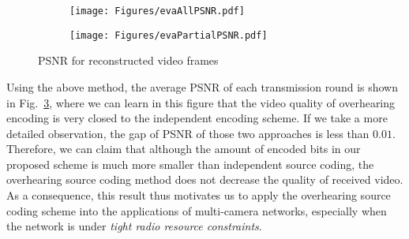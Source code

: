 %
\begin{figure}
\begin{center}
\begin{subfigure}[b]{\columnwidth}
\texttt{[image: Figures/evaAllPSNR.pdf]}
\caption{\label{fig::evaAllPSNR}}
\end{subfigure}
\begin{subfigure}[b]{\columnwidth}
\texttt{[image: Figures/evaPartialPSNR.pdf]}
\caption{\label{fig::evaPartialPSNR}}
\end{subfigure}
\caption{\label{fig::evaMultiRunPSNR} PSNR for reconstructed video frames}
\end{center}
\end{figure}
%
Using the above method, the average PSNR of each transmission round is shown in Fig.~\ref{fig::evaMultiRunPSNR}, where we can learn in this figure that the video quality of overhearing encoding is very closed to the independent encoding scheme.
If we take a more detailed observation, the gap of PSNR of those two approaches is less than $0.01$.
Therefore, we can claim that although the amount of encoded bits in our proposed scheme is much more smaller than independent source coding, the overhearing source coding method does not decrease the quality of received video.
As a consequence, this result thus motivates us to apply the overhearing source coding scheme into the applications of multi-camera networks, especially when the network is under \emph{tight radio resource constraints}.

